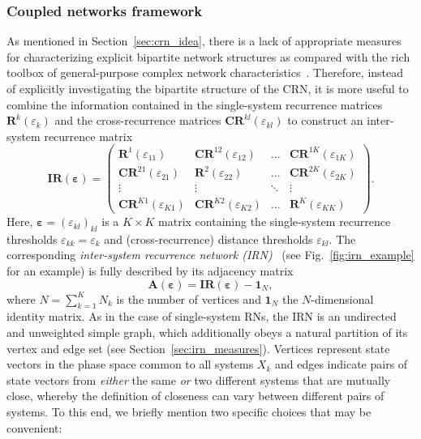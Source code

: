 		\subsubsection{Coupled networks framework}
        		As mentioned in Section~\ref{sec:crn_idea}, there is a lack of appropriate measures for characterizing explicit bipartite network structures as compared with the rich toolbox of general-purpose complex network characteristics~\cite{Boccaletti2006,Costa2007}. Therefore, instead of explicitly investigating the bipartite structure of the CRN, it is more useful to combine the information contained in the single-system recurrence matrices $\mathbf{R}^k(\varepsilon_k)$ and the cross-recurrence matrices $\mathbf{CR}^{kl}(\varepsilon_{kl})$ to construct an inter-system recurrence matrix~\cite{Feldhoff2012}
\begin{equation} 
\mathbf{IR}(\mathbf{\varepsilon})=\left( \begin{array}{cccc} \mathbf{R}^1(\varepsilon_{11}) & \mathbf{CR}^{12}(\varepsilon_{12}) & \hdots & \mathbf{CR}^{1K}(\varepsilon_{1K}) \\
\mathbf{CR}^{21}(\varepsilon_{21}) & \mathbf{R}^2(\varepsilon_{22}) & \hdots & \mathbf{CR}^{2K}(\varepsilon_{2K}) \\
\vdots & \vdots & \ddots & \vdots \\ \mathbf{CR}^{K1}(\varepsilon_{K1}) & \mathbf{CR}^{K2}(\varepsilon_{K2}) & \hdots & \mathbf{R}^K(\varepsilon_{KK}) \end{array} \right).
\label{isrm}
\end{equation}
Here, $\mathbf{\varepsilon}=(\varepsilon_{kl})_{kl}$ is a $K \times K$ matrix containing the single-system recurrence thresholds $\varepsilon_{kk}=\varepsilon_k$ and (cross-recurrence) distance thresholds $\varepsilon_{kl}$. The corresponding \emph{inter-system recurrence network (IRN)}~\cite{Feldhoff2012} (see Fig.~\ref{fig:irn_example} for an example) is fully described by its adjacency matrix
\begin{equation}
\mathbf{A}(\mathbf{\varepsilon})=\mathbf{IR}(\mathbf{\varepsilon}) - \mathbf{1}_N,
\end{equation}
where $N=\sum_{k=1}^K N_k$ is the number of vertices and $\mathbf{1}_N$ the $N$-dimensional identity matrix. As in the case of single-system RNs, the IRN is an undirected and unweighted simple graph, which additionally obeys a natural partition of its vertex and edge set (see Section~\ref{sec:irn_measures}). Vertices represent state vectors in the phase space common to all systems $X_k$ and edges indicate pairs of state vectors from \emph{either} the same \emph{or} two different systems that are mutually close, whereby the definition of closeness can vary between different pairs of systems. To this end, we briefly mention two specific choices that may be convenient:

